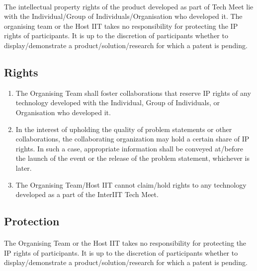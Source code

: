
\paragraph{}
The intellectual property rights of the product developed as part of Tech Meet lie with the Individual/Group of Individuals/Organisation who developed it. The organising team or the Host IIT takes no responsibility for protecting the IP rights of participants. It is up to the discretion of participants whether to display/demonstrate a product/solution/research for which a patent is pending.

\subsection{Rights}
\begin{enumerate}
    \item The Organising Team shall foster collaborations that reserve IP rights of any technology developed with the Individual, Group of Individuals, or Organisation who developed it.
    \item In the interest of upholding the quality of problem statements or other collaborations, the collaborating organization may hold a certain share of IP rights. In such a case, appropriate information shall be conveyed at/before the launch of the event or the release of the problem statement, whichever is later.
    \item The Organising Team/Host IIT cannot claim/hold rights to any technology developed as a part of the InterIIT Tech Meet.
\end{enumerate}

\subsection{Protection}
\paragraph{}
The Organising Team or the Host IIT takes no responsibility for protecting the IP rights of participants. It is up to the discretion of participants whether to display/demonstrate a product/solution/research for which a patent is pending.

